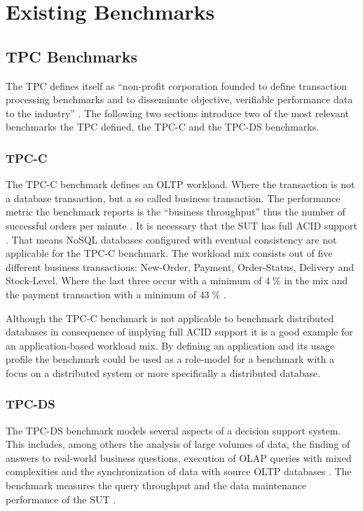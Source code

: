 
\chapter{Existing Benchmarks}
\label{cha:analysis}

\section{TPC Benchmarks}
\label{sec:tpc}
The \acf{TPC} defines itself as \enquote{non-profit corporation founded to define transaction processing benchmarks and to disseminate objective, verifiable performance data to the industry} \cite[10]{tpc.2013}. The following two sections introduce two of the most relevant benchmarks the \ac{TPC} defined, the \ac{TPC}-C and the \ac{TPC}-DS benchmarks. 

\subsection{TPC-C}
\label{subsec:tpc-c}
The \ac{TPC}-C benchmark defines an \acf{OLTP} workload. Where the transaction is not a database transaction, but a so called business transaction. The performance metric the benchmark reports is the \enquote{business throughput} thus the number of successful orders per minute \cite[7]{tpcc.2010}. It is necessary that the \ac{SUT} has full ACID support \cite[47]{tpcc.2010}. That means NoSQL databases configured with eventual consistency are not applicable for the \ac{TPC}-C benchmark. The workload mix consists out of five different business transactions: New-Order, Payment, Order-Status, Delivery and Stock-Level. Where the last three occur with a minimum of $4\;\%$ in the mix and the payment transaction with a minimum of $43\;\%$ \cite[70]{tpcc.2010}.

Although the \ac{TPC}-C benchmark is not applicable to benchmark distributed databases in consequence of implying full ACID support it is a good example for an application-based workload mix. By defining an application and its usage profile the benchmark could be used as a role-model for a benchmark with a focus on a distributed system or more specifically a distributed database.

\subsection{TPC-DS}
\label{subsec:tpc-ds}
The \ac{TPC}-DS benchmark models several aspects of a decision support system. This includes, among others the analysis of large volumes of data, the finding of answers to real-world business questions, execution of \acf{OLAP} queries with mixed complexities and the synchronization of data with source \ac{OLTP} databases \cite[7]{tpcds.2012}. The benchmark measures the query throughput and the data maintenance performance of the \ac{SUT} \cite[7]{tpcds.2012}.

